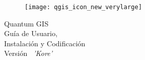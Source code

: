 
\begin{titlepage}
\begin{center}

\begin{figure}[H]
\begin{center}
\texttt{[image: qgis\_icon\_new\_verylarge]} 
\end{center}
\end{figure}

\Huge{Quantum GIS}\\
\vspace{0.5cm}
\Large{Guía de Usuario, \\Instalación y Codificación} \\
\vspace{0.5cm}
\Large{Versión ~\CURRENT \textsl{'Kore'}}

\end{center}
\end{titlepage}
